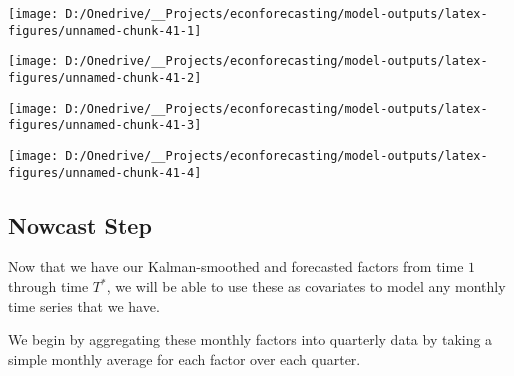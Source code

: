 \documentclass[11pt, letterpaper]{article}\usepackage[]{graphicx}\usepackage[]{color}
\begin{document}
{\centering \texttt{[image: D:/Onedrive/\_\_Projects/econforecasting/model-outputs/latex-figures/unnamed-chunk-41-1]} 

}




{\centering \texttt{[image: D:/Onedrive/\_\_Projects/econforecasting/model-outputs/latex-figures/unnamed-chunk-41-2]} 

}




{\centering \texttt{[image: D:/Onedrive/\_\_Projects/econforecasting/model-outputs/latex-figures/unnamed-chunk-41-3]} 

}




{\centering \texttt{[image: D:/Onedrive/\_\_Projects/econforecasting/model-outputs/latex-figures/unnamed-chunk-41-4]} 

}





\subsection{Nowcast Step}
Now that we have our Kalman-smoothed and forecasted factors from time $1$ through time $T^*$, we will be able to use these as covariates to model any monthly time series that we have.

We begin by aggregating these monthly factors into quarterly data by taking a simple monthly average for each factor over each quarter.
\end{document}
